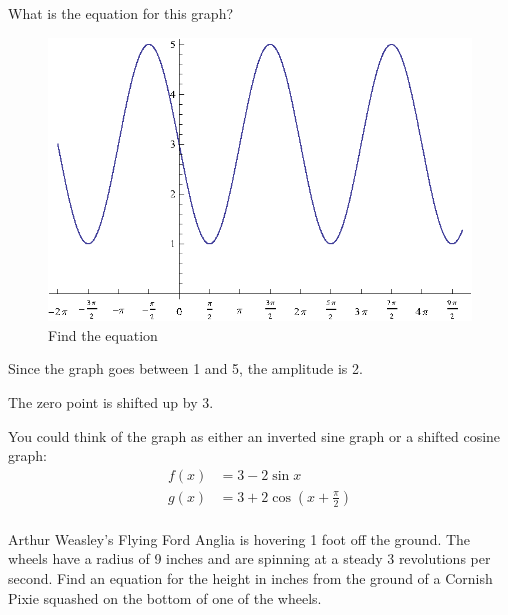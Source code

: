 \documentclass[fleqn,addpoints]{exam}
\begin{document}
\begin{questions}
\begin{solution}
          \end{solution}

        \question[10]
          What is the equation for this graph?
          
          \begin{figure}[H]
            \centering
            \includegraphics[scale=1.0]{graph4.eps}
            \caption{Find the equation}
          \end{figure}

          \begin{solution}
            \begin{itemize*}
              \item Since the graph goes between 1 and 5, the amplitude is 2.
              \item The zero point is shifted up by 3.
            \end{itemize*}

            You could think of the graph as either an inverted sine graph or a shifted cosine graph:
            \begin{align*}
              f(x) &= 3 - 2 \sin x \\
              g(x) &= 3 + 2 \cos \left( x + \frac{\pi}{2} \right) \\
            \end{align*}

          \end{solution}

          \question[10] Arthur Weasley's Flying Ford Anglia is hovering 1 foot off the ground.  The wheels have a radius
          of 9 inches and are spinning at a steady 3 revolutions per second.  Find an equation for the height in inches
          from the ground of a Cornish Pixie squashed on the bottom of one of the wheels.


\end{questions}
\end{document}

